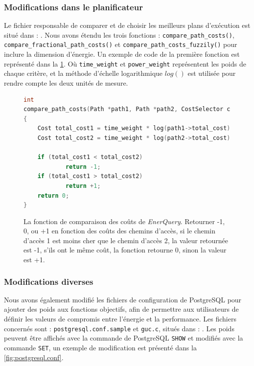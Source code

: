 \subsubsection{Modifications dans le planificateur}
Le fichier responsable de comparer et de choisir les meilleurs plans d'exécution est situé dans : . Nous avons étendu les trois fonctions : \texttt{compare\_path\_costs()}, \texttt{compare\_fractional\_path\_costs()} et \texttt{compare\_path\_costs\_fuzzily()} pour inclure la dimension d'énergie. Un exemple de code de la première fonction est représenté dans la \ref{fig:enerquery-pathnode}. Où \texttt{time\_weight} et \texttt{power\_weight} représentent les poids de chaque critère, et la méthode d’échelle logarithmique $log()$ est utilisée pour rendre compte les deux unités de mesure.

\begin{figure}
\begin{lstlisting}[language=C]
int
compare_path_costs(Path *path1, Path *path2, CostSelector criterion)
{
	Cost total_cost1 = time_weight * log(path1->total_cost) + power_weight * log(path1->power_cost);
	Cost total_cost2 = time_weight * log(path2->total_cost) + power_weight * log(path2->power_cost);

	if (total_cost1 < total_cost2)
			return -1;
	if (total_cost1 > total_cost2)
			return +1;
	return 0;
}
\end{lstlisting}
  \caption{La fonction de comparaison des coûts de \textit{EnerQuery}. Retourner -1, 0, ou +1 en fonction des coûts des chemins d'accès, si le chemin d'accès 1 est moins cher que le chemin d'accès 2, la valeur retournée est -1, s'ils ont le même coût, la fonction retourne 0, sinon la valeur est +1.}\label{fig:enerquery-pathnode}
\end{figure}

\subsubsection{Modifications diverses}
Nous avons également modifié les fichiers de configuration de PostgreSQL pour ajouter des poids aux fonctions objectifs, afin de permettre aux utilisateurs de définir les valeurs de compromis entre l'énergie et la performance. Les fichiers concernés sont : \texttt{postgresql.conf.sample} et \texttt{guc.c}, situés dans : . Les poids peuvent être affichés avec la commande de PostgreSQL \texttt{SHOW} et modifiés avec la commande \texttt{SET}, un exemple de modification est présenté dans la \ref{fig:postgresql.conf}.

